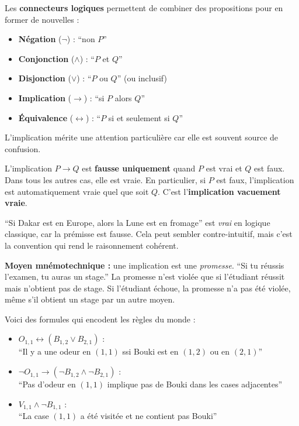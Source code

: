 \documentclass[11pt,a4paper]{article}
\begin{document}
\begin{definitionbox}
Les \textbf{connecteurs logiques} permettent de combiner des propositions pour en former de nouvelles :
\begin{itemize}[nosep]
    \item \textbf{Négation} ($\neg$) : ``non $P$''
    \item \textbf{Conjonction} ($\land$) : ``$P$ et $Q$''
    \item \textbf{Disjonction} ($\lor$) : ``$P$ ou $Q$'' (ou inclusif)
    \item \textbf{Implication} ($\rightarrow$) : ``si $P$ alors $Q$''
    \item \textbf{Équivalence} ($\leftrightarrow$) : ``$P$ si et seulement si $Q$''
\end{itemize}
\end{definitionbox}

L'implication mérite une attention particulière car elle est souvent source de confusion.

\begin{attentionbox}
L'implication $P \rightarrow Q$ est \textbf{fausse uniquement} quand $P$ est vrai et $Q$ est faux. Dans tous les autres cas, elle est vraie. En particulier, si $P$ est faux, l'implication est automatiquement vraie quel que soit $Q$. C'est l'\textbf{implication vacuement vraie}.

``Si Dakar est en Europe, alors la Lune est en fromage'' est \textit{vrai} en logique classique, car la prémisse est fausse. Cela peut sembler contre-intuitif, mais c'est la convention qui rend le raisonnement cohérent.

\textbf{Moyen mnémotechnique :} une implication est une \textit{promesse}. ``Si tu réussis l'examen, tu auras un stage.'' La promesse n'est violée que si l'étudiant réussit mais n'obtient pas de stage. Si l'étudiant échoue, la promesse n'a pas été violée, même s'il obtient un stage par un autre moyen.
\end{attentionbox}

\begin{exemplebox}
Voici des formules qui encodent les règles du monde :
\begin{itemize}
    \item $O_{1,1} \leftrightarrow (B_{1,2} \lor B_{2,1})$ :\\ ``Il y a une odeur en $(1,1)$ ssi Bouki est en $(1,2)$ ou en $(2,1)$''
    \item $\neg O_{1,1} \rightarrow (\neg B_{1,2} \land \neg B_{2,1})$ :\\ ``Pas d'odeur en $(1,1)$ implique pas de Bouki dans les cases adjacentes''
    \item $V_{1,1} \land \neg B_{1,1}$ :\\ ``La case $(1,1)$ a été visitée et ne contient pas Bouki''
\end{itemize}
\end{exemplebox}
\end{document}
